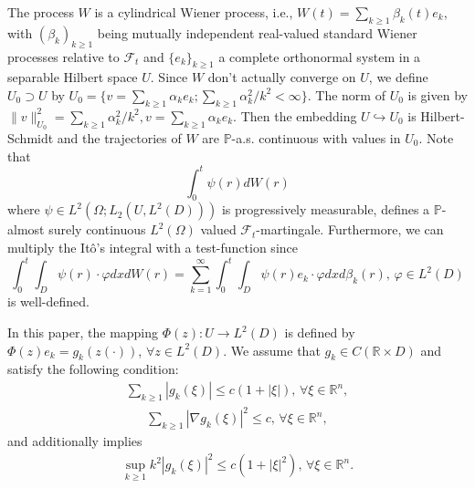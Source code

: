 \documentclass[reqno]{amsart}
\theoremstyle{definition}
\theoremstyle{remark}
\numberwithin{equation}{section} \allowdisplaybreaks
\begin{document}
The process $W$ is a cylindrical Wiener process, i.e.,
$W(t)=\sum_{k\geq1}\beta_k(t)e_k$, with $(\beta_k)_{k\geq1}$ being
mutually independent real-valued standard Wiener processes relative
to $\mathscr{F}_{t}$ and $\{e_k\}_{k\geq1}$ a complete orthonormal
system in a separable Hilbert space ${U}$. Since $W$ don't actually
converge on $U$, we define $U_0\supset U$ by
$U_0=\{v=\sum_{k\ge1}\alpha_ke_k;\sum_{k\ge 1}{{\alpha_k^2}/
k^2}<\infty \}$. The norm of $U_0$ is given by
$\|v\|^2_{U_0}=\sum_{k\ge 1}{\alpha_k^2}/k^2, v=\sum_{k\ge
1}\alpha_ke_k$. Then the embedding ${U}\hookrightarrow {U}_0$ is
Hilbert-Schmidt and the trajectories of $W$ are $\mathbb{P}$-a.s.
continuous with values in ${U}_0$. Note that
$$\int_0^t \psi(r)dW(r)$$
where $\psi \in L^2(\Omega; L_2({U},L^2(D)))$ is progressively
measurable, defines a $\mathbb{P}$-almost surely continuous
$L^2(\Omega)$ valued $\mathscr{F}_t$-martingale. Furthermore, we can
multiply the It\^{o}'s integral with a test-function since
$$\int_0^t\int_{D} \psi(r)\cdot\varphi dxdW(r)
=\sum_{k=1}^{\infty}\int_0^t\int_{D}\psi(r)e_k\cdot\varphi
dxd\beta_k(r),\,\varphi\in L^2(D)$$ is well-defined.

In this paper, the mapping $\Phi(z):{U}\rightarrow L^2(D)$ is
defined by $\Phi(z)e_k=g_k(z(\cdot))$, $\forall z\in L^2(D)$. We
assume that $g_k\in C(\mathbb{R}\times D)$ and satisfy the following
condition:
\begin{equation}\label{2.1}
\begin{split}
\sum_{k\geq1}|g_k(\xi)|\leq c(1+|\xi|),\, \forall \xi \in
\mathbb{R}^n,
\end{split}
\end{equation}
\begin{equation}\label{2.2}
\begin{split}
\sum_{k\geq1}|\nabla g_k(\xi)|^2\leq c,\, \forall \xi \in
\mathbb{R}^n,
\end{split}
\end{equation}
and additionally implies
\begin{equation}\label{2.3}
\begin{split}
\sup_{k\geq1}k^2|g_k(\xi)|^2\leq c(1+|\xi|^2),\, \forall \xi \in
\mathbb{R}^n.
\end{split}
\end{equation}
\end{document}
